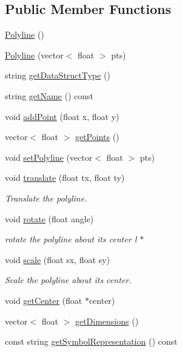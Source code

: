 \subsection*{Public Member Functions}
\begin{DoxyCompactItemize}
\item 
\mbox{\hyperlink{classbridges_1_1datastructure_1_1_polyline_a488f6612485fc66534035c3574281a11}{Polyline}} ()
\item 
\mbox{\hyperlink{classbridges_1_1datastructure_1_1_polyline_aceb69c3294ab4c16b2931e1073d3f996}{Polyline}} (vector$<$ float $>$ pts)
\item 
string \mbox{\hyperlink{classbridges_1_1datastructure_1_1_polyline_a49b37ad55cf64fe759ee5a0f46e2e0cc}{get\+Data\+Struct\+Type}} ()
\item 
string \mbox{\hyperlink{classbridges_1_1datastructure_1_1_polyline_a46f2830cd85a09e9c4d62d54110dbe13}{get\+Name}} () const
\item 
void \mbox{\hyperlink{classbridges_1_1datastructure_1_1_polyline_a00698223911f07cafca29ec80c507678}{add\+Point}} (float x, float y)
\item 
vector$<$ float $>$ \mbox{\hyperlink{classbridges_1_1datastructure_1_1_polyline_a634034b6874af45e2b8c56d70e8725c5}{get\+Points}} ()
\item 
void \mbox{\hyperlink{classbridges_1_1datastructure_1_1_polyline_ab1fb850dabd3ed58fd4f916992a0b9a6}{set\+Polyline}} (vector$<$ float $>$ pts)
\item 
void \mbox{\hyperlink{classbridges_1_1datastructure_1_1_polyline_a0b651b1c383b228f8d473232e64e4bda}{translate}} (float tx, float ty)
\begin{DoxyCompactList}\small\item\em Translate the polyline. \end{DoxyCompactList}\item 
void \mbox{\hyperlink{classbridges_1_1datastructure_1_1_polyline_aa61978ccbb0b086dc8f55e90ccca23c9}{rotate}} (float angle)
\begin{DoxyCompactList}\small\item\em rotate the polyline about its center l $\ast$ \end{DoxyCompactList}\item 
void \mbox{\hyperlink{classbridges_1_1datastructure_1_1_polyline_adf06f484d9a48960de84ed3646903f3a}{scale}} (float sx, float sy)
\begin{DoxyCompactList}\small\item\em Scale the polyline about its center. \end{DoxyCompactList}\item 
void \mbox{\hyperlink{classbridges_1_1datastructure_1_1_polyline_ad0783deb77873eda19528681bbbca25c}{get\+Center}} (float $\ast$center)
\item 
vector$<$ float $>$ \mbox{\hyperlink{classbridges_1_1datastructure_1_1_polyline_aebcd7f4f80e2eed35057e5b1d82ba4e7}{get\+Dimensions}} ()
\item 
const string \mbox{\hyperlink{classbridges_1_1datastructure_1_1_polyline_a176c06400a3b105fa651c69891381201}{get\+Symbol\+Representation}} () const
\end{DoxyCompactItemize}
